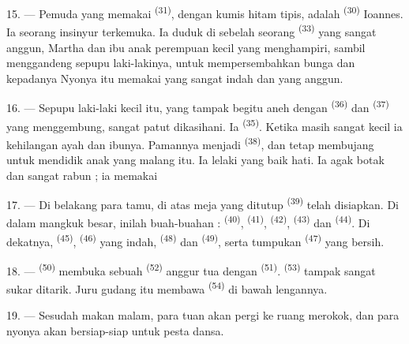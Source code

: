 15. --- Pemuda yang memakai 
\textsuperscript{(31)}, dengan kumis hitam tipis, adalah  \textsuperscript{(30)} Ioannes. Ia seorang insinyur
terkemuka. Ia duduk di sebelah seorang 
\textsuperscript{(33)} yang sangat anggun, 
Martha dan ibu anak perempuan kecil yang menghampiri, sambil
menggandeng sepupu laki-lakinya, untuk mempersembahkan bunga dan
 kepadanya  Nyonya itu
memakai  yang sangat indah dan  yang anggun.

16. --- Sepupu laki-laki kecil itu, yang tampak begitu aneh dengan
 \textsuperscript{(36)} dan 
\textsuperscript{(37)} yang menggembung, sangat patut dikasihani. Ia
 \textsuperscript{(35)}. Ketika masih sangat
kecil ia kehilangan ayah dan ibunya. Pamannya menjadi 
\textsuperscript{(38)}, dan tetap membujang untuk mendidik anak yang
malang itu. Ia lelaki yang baik hati. Ia agak botak dan sangat rabun ;
ia memakai 

\VUsaut{2.4mm}
\VUsaut{3.0mm}

17. --- Di belakang para tamu, di atas meja yang ditutup
  \textsuperscript{(39)}
telah disiapkan. Di dalam mangkuk besar, inilah buah-buahan :
 \textsuperscript{(40)}, 
\textsuperscript{(41)},  \textsuperscript{(42)},
 \textsuperscript{(43)} dan 
\textsuperscript{(44)}. Di dekatnya, 
\textsuperscript{(45)},  \textsuperscript{(46)} yang indah,
 \textsuperscript{(48)} dan
 \textsuperscript{(49)}, serta tumpukan
 \textsuperscript{(47)} yang bersih.

18. ---  \textsuperscript{(50)} membuka
sebuah  \textsuperscript{(52)} anggur tua dengan
 \textsuperscript{(51)}. 
\textsuperscript{(53)} tampak sangat sukar ditarik. Juru gudang itu
membawa  \textsuperscript{(54)} di bawah lengannya.

19. --- Sesudah makan malam, para tuan akan pergi ke ruang merokok,
dan para nyonya akan bersiap-siap untuk pesta dansa.

